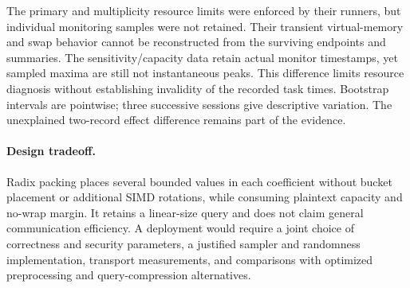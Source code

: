 The primary and multiplicity resource limits were enforced by their
runners, but individual monitoring samples were not retained. Their
transient virtual-memory and swap behavior cannot be reconstructed from
the surviving endpoints and summaries. The sensitivity/capacity data
retain actual monitor timestamps, yet sampled maxima are still not
instantaneous peaks. This difference limits resource diagnosis without
establishing invalidity of the recorded task times. Bootstrap intervals
are pointwise; three successive sessions give descriptive variation.
The unexplained two-record effect difference remains part of the evidence.

\paragraph{Design tradeoff.}
Radix packing places several bounded values in each coefficient without
bucket placement or additional SIMD rotations, while consuming plaintext
capacity and no-wrap margin. It retains a linear-size query and does not
claim general communication efficiency. A deployment would require a
joint choice of correctness and security parameters, a justified sampler
and randomness implementation, transport measurements, and comparisons
with optimized preprocessing and query-compression alternatives.
